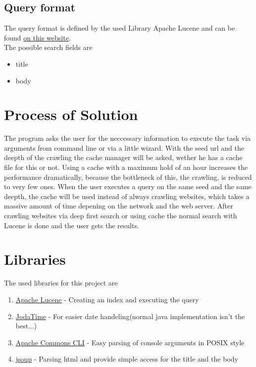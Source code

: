 \documentclass{scrartcl}
\begin{document}
\subsection{Query format}
The query format is defined by the used Library Apache Lucene and can be found \href{http://lucene.apache.org/core/4_6_0/queryparser/org/apache/lucene/queryparser/classic/package-summary.html#package_description}{on this website}.  \\
The possible search fields are 
\begin{itemize}
	\item title
	\item body
\end{itemize}

\section{Process of Solution}
The program asks the user for the neccessary information to execute the task via arguments from command line or via a little wizard.
With the seed url and the deepth of the crawling the cache manager will be asked, wether he has a cache file for this or not. Using a cache with a maximum hold of an hour increases the performance dramatically, because the bottleneck of this, the crawling, is reduced to very few ones. When the user executes a query on the same seed and the same deepth, the cache will be used instead of always crawling websites, which takes a massive amount of time depening on the network and the web server.
After crawling websites via deep first search or using cache the normal search with Lucene is done and the user gets the results.

\section{Libraries}
The used libraries for this project are

\begin{enumerate}
	\item \href{http://lucene.apache.org/}{Apache Lucene} - Creating an index and executing the query
	\item \href{http://www.joda.org/joda-time/}{JodaTime} - For easier date handeling(normal java implementation isn't the best...)
	\item \href{http://commons.apache.org/proper/commons-cli/}{Apache Commons CLI} - Easy parsing of console arguments in POSIX style
	\item \href{http://jsoup.org/}{jsoup} - Parsing html and provide simple access for the title and the body

\end{enumerate}
\end{document}
